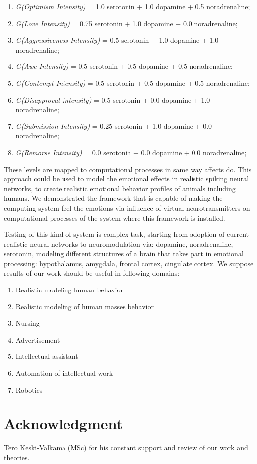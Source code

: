 \begin{enumerate}
 \item  \emph{G(Optimism Intensity)} = 1.0 serotonin  + 1.0 dopamine + 0.5 noradrenaline;
 \item  \emph{G(Love Intensity)} = 0.75 serotonin + 1.0 dopamine + 0.0 noradrenaline;
 \item  \emph{G(Aggressiveness Intensity)} = 0.5 serotonin + 1.0 dopamine + 1.0 noradrenaline;
 \item  \emph{G(Awe Intensity)} = 0.5 serotonin + 0.5 dopamine + 0.5 noradrenaline;
 \item  \emph{G(Contempt Intensity)} = 0.5 serotonin + 0.5 dopamine + 0.5 noradrenaline;
 \item  \emph{G(Disapproval Intensity)} = 0.5 serotonin + 0.0 dopamine + 1.0 noradrenaline;
 \item  \emph{G(Submission Intensity)} = 0.25 serotonin + 1.0 dopamine + 0.0 noradrenaline;
 \item  \emph{G(Remorse Intensity)} = 0.0 serotonin + 0.0 dopamine + 0.0 noradrenaline;
\end{enumerate}

These levels are mapped to computational processes in same way affects do.
This approach could be used to model the emotional effects in realistic spiking neural networks, to create realistic emotional behavior profiles of animals including humans.
We demonstrated the framework that is capable of making the computing system feel the emotions via influence of virtual neurotransmitters on computational processes of the system where this framework is installed.

Testing of this kind of system is complex task, starting from adoption of current realistic neural networks to neuromodulation via: dopamine, noradrenaline, serotonin, modeling different structures of a brain that takes part in emotional processing: hypothalamus, amygdala, frontal cortex, cingulate cortex.
We suppose results of our work should be useful in following domains:

\begin{enumerate}
 \item  Realistic modeling human behavior
 \item  Realistic modeling of human masses behavior
 \item  Nursing
 \item  Advertisement
 \item  Intellectual assistant
 \item  Automation of intellectual work
 \item  Robotics
\end{enumerate}

\section{Acknowledgment}

Tero Keski-Valkama (MSc) for his constant support and review of our work and theories.


